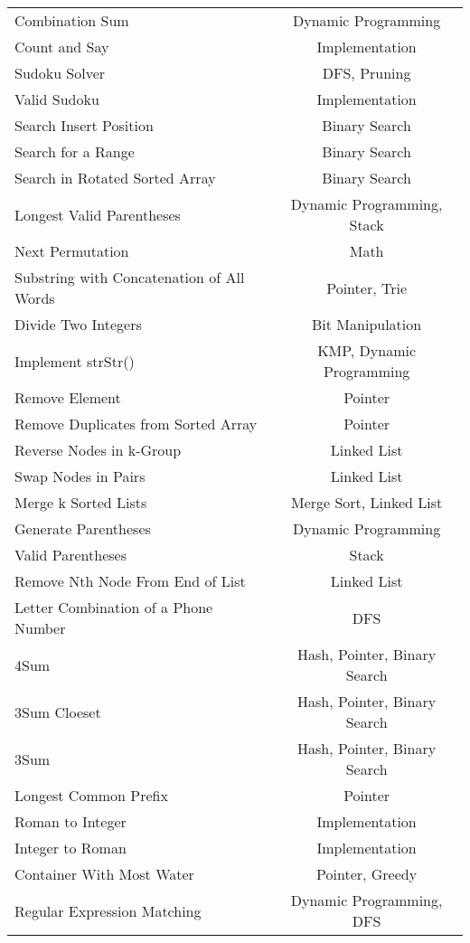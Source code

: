\documentclass[paper=a4, fontsize=11pt]{scrartcl} %
\begin{document}
\begin{center}
\begin{longtable}{|l|c|}
    Combination Sum &   Dynamic Programming \\
    Count and Say   &   Implementation  \\
    Sudoku Solver   &   DFS, Pruning \\
    Valid Sudoku    &   Implementation \\
    Search Insert Position  &   Binary Search   \\
    Search for a Range  &   Binary Search   \\
    Search in Rotated Sorted Array  &   Binary Search   \\
    Longest Valid Parentheses   &   Dynamic Programming, Stack   \\
    Next Permutation    &   Math    \\
    Substring with Concatenation of All Words   &   Pointer, Trie \\
    Divide Two Integers &   Bit Manipulation    \\
    Implement strStr()  &   KMP, Dynamic Programming  \\
    Remove Element  &   Pointer \\
    Remove Duplicates from Sorted Array &   Pointer \\
    Reverse Nodes in k-Group    &   Linked List \\
    Swap Nodes in Pairs     &   Linked List \\
    Merge k Sorted Lists    &   Merge Sort, Linked List\\
    Generate Parentheses    &   Dynamic Programming \\
    Valid Parentheses   &   Stack   \\
    Remove Nth Node From End of List    &   Linked List \\
    Letter Combination of a Phone Number    &   DFS \\
    4Sum    &   Hash, Pointer, Binary Search \\
    3Sum Cloeset    &   Hash, Pointer, Binary Search \\
    3Sum    &   Hash, Pointer, Binary Search \\
    Longest Common Prefix   &   Pointer \\
    Roman to Integer    &   Implementation  \\
    Integer to Roman    &   Implementation  \\
    Container With Most Water   &   Pointer, Greedy\\
    Regular Expression Matching &   Dynamic Programming, DFS  \\

\end{longtable}
\end{center}
\end{document}
